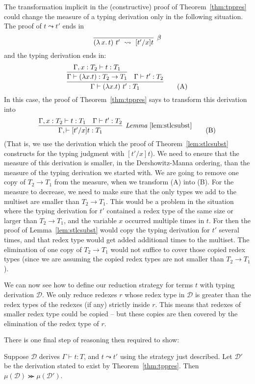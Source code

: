 \documentclass{article}
\providecommand{\betarule}[0]{\infer[\beta]{(\lambda\,x.\, t)\ t'\ \leadsto\ [t'/x]t}
                                {\ }}
\begin{document}
The transformation implicit in the (constructive) proof of Theorem~\ref{thm:tppres}
could change the measure of a typing derivation only in the following situation.  The
proof of $t \leadsto t'$ ends in
\[ 
\betarule
\]
\noindent and the typing derivation ends in:
\begin{equation} 
\infer{\Gamma \vdash (\lambda x.t)\ t' : T_1}
       {\infer{\Gamma \vdash (\lambda x.t) : T_2\to T_1}
              {\Gamma, x : T_2 \vdash t : T_1} & \Gamma \vdash t' : T_2}
\tag{A}
\end{equation}
\noindent In this case, the proof of Theorem~\ref{thm:tppres} says
to transform this derivation into
\begin{equation}
\infer[\textit{Lemma}~\ref{lem:stlcsubst}]
      {\Gamma,\vdash [t'/x]t:T_1}
      {\Gamma, x : T_2 \vdash t : T_1 & \Gamma \vdash t' : T_2}
\tag{B}
\end{equation}
\noindent (That is, we use the derivation which the proof of Theorem~\ref{lem:stlcsubst} constructs
for the typing judgment with $[t'/x]t$).  We need to ensure that the measure of this derivation is smaller,
in the Dershowitz-Manna ordering, than the measure of the typing derivation
we started with.  We are going to remove one copy of $T_2 \to T_1$ from
the measure, when we transform (A) into (B).  For the measure to decrease,
we need to make sure that the only types we add to the multiset are smaller than $T_2 \to T_1$.
This would be a problem in the situation where the typing derivation for $t'$ contained a redex
type of the same size or larger than $T_2 \to T_1$, and the variable $x$ occurred multiple times in $t$.  For then
the proof of Lemma~\ref{lem:stlcsubst} would copy the typing derivation for $t'$
several times, and that redex type would get added additional times to the multiset.  The elimination
of one copy of $T_2 \to T_1$ would not suffice to cover those copied redex types (since we are assuming
the copied redex types are not smaller than $T_2 \to T_1$).

We can now see how to define our reduction strategy for terms $t$
with typing derivation $\mathcal{D}$.  We only reduce redexes $r$ whose
redex type in $\mathcal{D}$ is greater than the redex types of the
redexes (if any) strictly inside $r$.  This means that redexes of smaller
redex type could be copied -- but these copies are then covered by the
elimination of the redex type of $r$.

There is one final step of reasoning then required to show:

\vspace{.25cm}
\begin{theorem}
\label{thm:meas}
  Suppose $\mathcal{D}$ derives $\Gamma \vdash t : T$, and $t \leadsto t'$ using
  the strategy just described.
  Let $\mathcal{D}'$ be the derivation stated to exist by Theorem~\ref{thm:tppres}.
  Then $\mu(\mathcal{D}) \ggcurly \mu(\mathcal{D}')$.
\end{theorem}
\end{document}
